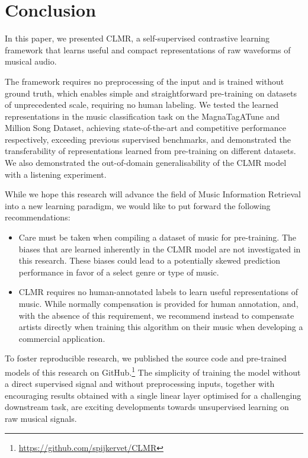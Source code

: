 \chapter{Conclusion}\label{sec:conclusion}
In this paper, we presented CLMR, a self-supervised contrastive learning framework that learns useful and compact representations of raw waveforms of musical audio.

The framework requires no preprocessing of the input and is trained without ground truth, which enables simple and straightforward pre-training on datasets of unprecedented scale, requiring no human labeling. We tested the learned representations in the music classification task on the MagnaTagATune and Million Song Dataset, achieving state-of-the-art and competitive performance respectively, exceeding previous supervised benchmarks, and demonstrated the transferability of representations learned from pre-training on different datasets. We also demonstrated the out-of-domain generalisability of the CLMR model with a listening experiment.

While we hope this research will advance the field of Music Information Retrieval into a new learning paradigm, we would like to put forward the following recommendations:

\begin{itemize}
    \item Care must be taken when compiling a dataset of music for pre-training. The biases that are learned inherently in the CLMR model are not investigated in this research. These biases could lead to a potentially skewed prediction performance in favor of a select genre or type of music.
    \item CLMR requires no human-annotated labels to learn useful representations of music. While normally compensation is provided for human annotation, and, with the absence of this requirement, we recommend instead to compensate artists directly when training this algorithm on their music when developing a commercial application.
\end{itemize}

To foster reproducible research, we published the source code and pre-trained models of this research on GitHub.\footnote{\url{https://github.com/spijkervet/CLMR}}
The simplicity of training the model without a direct supervised signal and without preprocessing inputs, together with encouraging results obtained with a single linear layer optimised for a challenging downstream task, are exciting developments towards unsupervised learning on raw musical signals.